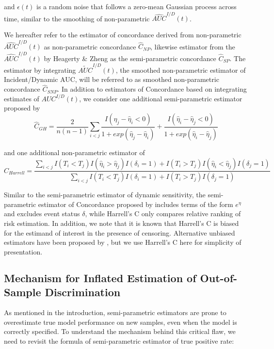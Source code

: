 \documentclass[useAMS,usenatbib, referee]{biom}
\begin{document}
and $\epsilon(t)$ is a random noise that follows a zero-mean Gaussian process across time, similar to the smoothing of non-parametric $\hat{AUC}^{I/D}(t)$. 

We hereafter refer to the estimator of concordance derived from non-parametric $\hat{AUC}^{I/D}(t)$ as non-parametric concordance $\hat{C}_{NP}$, likewise estimator from the $\hat{AUC}^{I/D}(t)$ by  Heagerty \& Zheng as the semi-parametric concordance $\hat{C}_{SP}$. 
The estimator by integrating $\tilde{AUC}^{I/D}(t)$, the smoothed non-parametric estimator of Incident/Dynamic AUC, will be referred to as smoothed non-parametric concordance $\hat{C}_{SNP}$. 
In addition to estimators of Concordance based on integrating estimates of $AUC^{I/D}(t)$, we consider one additional semi-parametric estimator proposed by \citet{gh2005}
\[
\hat{C}_{GH} = \frac{2}{n(n-1)}\sum_{i<j}{\frac{I(\hat{\eta}_j-\hat{\eta}_i<0)}{1+exp(\hat{\eta}_j-\hat{\eta}_i)}+\frac{I(\hat{\eta}_i-\hat{\eta}_j<0)}{1+exp(\hat{\eta}_i-\hat{\eta}_j)}}
\]

and one additional non-parametric estimator of \citet{Harrell1996}
\[
\hat{C}_{Harrell} = 
\frac{\sum_{i<j}I(T_i<T_j)I(\hat{\eta}_i>\hat{\eta}_j)I(\delta_i=1)+I(T_i>T_j)I(\hat{\eta}_i<\hat{\eta}_j)I(\delta_j=1)}{\sum_{i<j}I(T_i<T_j)I(\delta_i=1)+I(T_i>T_j)I(\delta_j=1)} 
\]


Similar to the semi-parametric estimator of dynamic sensitivity, the semi-parametric estimator of Concordance proposed by \citet{gh2005} includes terms of the form $e^{\eta}$ and excludes event status $\delta$, while Harrell's C only compares relative ranking of risk estimation. In addition, we note that it is known that Harrell's C is biased for the estimand of interest in the presence of censoring. Alternative unbiased estimators have been proposed by \citet{Uno2011}, but we use Harrell's C here for simplicity of presentation. 

\subsection{Mechanism for Inflated Estimation of Out-of-Sample Discrimination}
\label{subsec:methods_mechanism}

As mentioned in the introduction, semi-parametric estimators are prone to overestimate true model performance on new samples, even when the model is correctly specified. To understand the mechanism behind this critical flaw, we need to revisit the formula of semi-parametric estimator of true positive rate:
\end{document}
